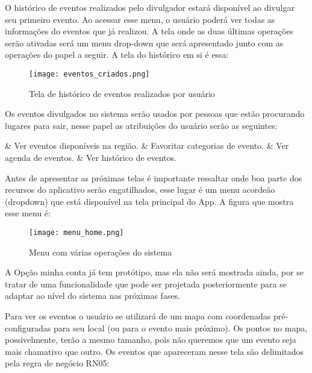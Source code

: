 \documentclass{article}
\begin{document}
				O histórico de eventos realizados pelo divulgador estará disponível ao divulgar seu primeiro evento. Ao acessar esse menu, o usuário poderá ver todas as informações do eventos que já realizou. A tela onde as duas últimas operações serão ativadas será um menu drop-down que será apresentado junto com as operações do papel a seguir. A tela do histórico em si é essa:
				
				\begin{figure}[H]
				\begin{center}
				\texttt{[image: eventos\_criados.png]}
				\end{center}
				\caption{Tela de histórico de eventos realizados por usuário}
				\end{figure}
				
				Os eventos divulgados no sistema serão usados por pessoas que estão procurando lugares para sair, nesse papel as atribuições do usuário serão as seguintes:\medskip
				\begin{easylist}[itemize]
				& Ver eventos disponíveis na região.
				& Favoritar categorias de evento.
				& Ver agenda de eventos.
				& Ver histórico de eventos.
				\end{easylist}\medskip
				
				Antes de apresentar as próximas telas é importante ressaltar onde boa parte dos recursos do aplicativo serão engatilhados, esse lugar é um menu acordeão (dropdown) que está disponível na tela principal do App. A figura que mostra esse menu é:
				
				
				\begin{figure}[H]
				\begin{center}
				\texttt{[image: menu\_home.png]}
				\end{center}
				\caption{Menu com várias operações do sistema}
				\end{figure}
				
				A Opção minha conta já tem protótipo, mas ela não será mostrada ainda, por se tratar de uma funcionalidade que pode ser projetada posteriormente para se adaptar ao nível do sistema nas próximas fases.
				
				Para ver os eventos o usuário se utilizará de um mapa com coordenadas pré-configuradas para seu local (ou para o evento mais próximo). Os pontos no mapa, possivelmente, terão a mesmo tamanho, pois não queremos que um evento seja mais chamativo que outro. Os eventos que apareceram nesse tela são delimitados pela regra de negócio RN05:
				
\end{document}
